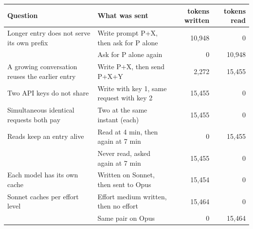 \begin{tabular*}{\textwidth}{@{\extracolsep{\fill}}>{\raggedright\arraybackslash}p{} >{\raggedright\arraybackslash}p{} r r@{}}
\toprule
Question & What was sent & tokens written & tokens read \\
\midrule
Longer entry does not serve its own prefix & Write prompt P+X, then ask for P alone & 10{,}948 & 0 \\
 & Ask for P alone again & 0 & 10{,}948 \\
A growing conversation reuses the earlier entry & Write P+X, then send P+X+Y & 2{,}272 & 15{,}455 \\
Two API keys do not share & Write with key 1, same request with key 2 & 15{,}455 & 0 \\
Simultaneous identical requests both pay & Two at the same instant (each) & 15{,}455 & 0 \\
Reads keep an entry alive & Read at 4 min, then again at 7 min & 0 & 15{,}455 \\
 & Never read, asked again at 7 min & 15{,}455 & 0 \\
Each model has its own cache & Written on Sonnet, then sent to Opus & 15{,}454 & 0 \\
Sonnet caches per effort level & Effort medium written, then no effort & 15{,}464 & 0 \\
 & Same pair on Opus & 0 & 15{,}464 \\
\bottomrule
\end{tabular*}
